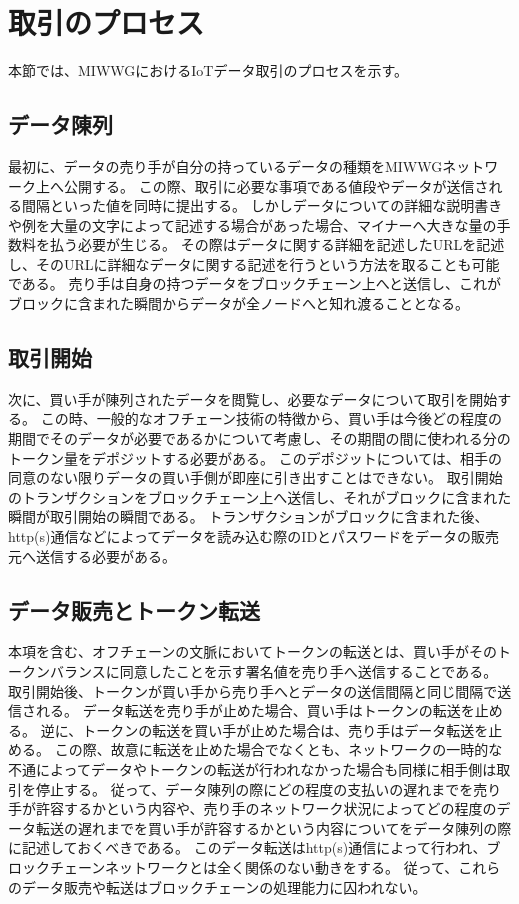 \section{取引のプロセス}
本節では、MIWWGにおけるIoTデータ取引のプロセスを示す。

\subsection{データ陳列}
最初に、データの売り手が自分の持っているデータの種類をMIWWGネットワーク上へ公開する。
この際、取引に必要な事項である値段やデータが送信される間隔といった値を同時に提出する。
しかしデータについての詳細な説明書きや例を大量の文字によって記述する場合があった場合、マイナーへ大きな量の手数料を払う必要が生じる。
その際はデータに関する詳細を記述したURLを記述し、そのURLに詳細なデータに関する記述を行うという方法を取ることも可能である。
売り手は自身の持つデータをブロックチェーン上へと送信し、これがブロックに含まれた瞬間からデータが全ノードへと知れ渡ることとなる。

\subsection{取引開始}
次に、買い手が陳列されたデータを閲覧し、必要なデータについて取引を開始する。
この時、一般的なオフチェーン技術の特徴から、買い手は今後どの程度の期間でそのデータが必要であるかについて考慮し、その期間の間に使われる分のトークン量をデポジットする必要がある。
このデポジットについては、相手の同意のない限りデータの買い手側が即座に引き出すことはできない。
取引開始のトランザクションをブロックチェーン上へ送信し、それがブロックに含まれた瞬間が取引開始の瞬間である。
トランザクションがブロックに含まれた後、http(s)通信などによってデータを読み込む際のIDとパスワードをデータの販売元へ送信する必要がある。

\subsection{データ販売とトークン転送}
本項を含む、オフチェーンの文脈においてトークンの転送とは、買い手がそのトークンバランスに同意したことを示す署名値を売り手へ送信することである。
取引開始後、トークンが買い手から売り手へとデータの送信間隔と同じ間隔で送信される。
データ転送を売り手が止めた場合、買い手はトークンの転送を止める。
逆に、トークンの転送を買い手が止めた場合は、売り手はデータ転送を止める。
この際、故意に転送を止めた場合でなくとも、ネットワークの一時的な不通によってデータやトークンの転送が行われなかった場合も同様に相手側は取引を停止する。
従って、データ陳列の際にどの程度の支払いの遅れまでを売り手が許容するかという内容や、売り手のネットワーク状況によってどの程度のデータ転送の遅れまでを買い手が許容するかという内容についてをデータ陳列の際に記述しておくべきである。
このデータ転送はhttp(s)通信によって行われ、ブロックチェーンネットワークとは全く関係のない動きをする。
従って、これらのデータ販売や転送はブロックチェーンの処理能力に囚われない。

